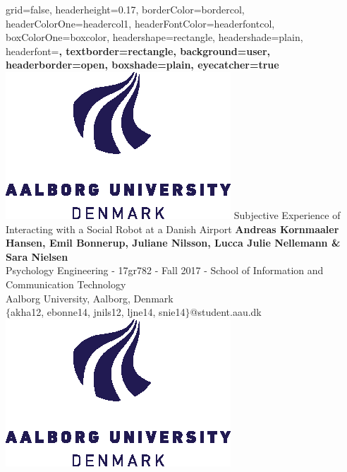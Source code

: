 \documentclass[paperwidth=160cm,paperheight=100cm,portrait,fontscale=0.2941]{baposter}
\begin{document}
\graphicspath{{Pictures/}}
\background{ %

}

\begin{poster}{
grid=false,
headerheight=0.17\textheight,
borderColor=bordercol, %
headerColorOne=headercol1, %
headerFontColor=headerfontcol, %
boxColorOne=boxcolor, %
headershape=rectangle, %
headershade=plain,
headerfont=\Large\sf\bf, %
textborder=rectangle,
background=user,
headerborder=open, %
boxshade=plain,
eyecatcher=true
}
%
%
{
\includegraphics[height=0.13\textheight]{aau_logo_new.eps}
} %
{\vspace{2pt}
Subjective Experience of Interacting with a Social Robot at a Danish Airport}
{
\vspace{3pt}
\normalsize{\textbf{Andreas Kornmaaler Hansen, Emil Bonnerup, Juliane Nilsson, Lucca Julie Nellemann \& Sara Nielsen}\\
Psychology Engineering - 17gr782 - Fall 2017 - School of Information and Communication Technology\\ Aalborg University, Aalborg, Denmark\\ }
$\{$akha12, ebonne14, jnils12, ljne14, snie14$\}$@student.aau.dk\\
}
{
\includegraphics[height=0.13\textheight]{aau_logo_new.eps}
}


\end{poster}
\end{document}
